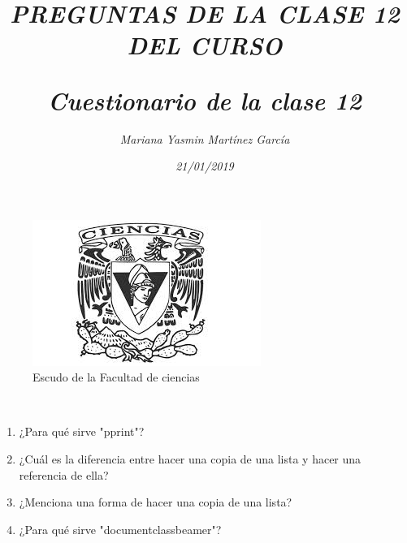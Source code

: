 \documentclass{article}
\title{\Huge\item\color{magenta}\textit{PREGUNTAS DE LA CLASE 12 DEL CURSO}}
\author{\Large\textit{Mariana Yasmin Martínez García}}
\date{\Large\textit{21/01/2019}}
\begin{document}
\begin{figure}[t]
	\centering
	\includegraphics[width=0.7\linewidth]{Imagenes/1}
	\caption{Escudo de la Facultad de ciencias}
	\label{figura:1}
\end{figure}

	\maketitle
		
	\newpage
	
	\title{\huge\color{magenta}\textbf{\textit{Cuestionario de la clase 12}}} \\
	\begin{enumerate}
		 \item{\Large\color{red} ¿Para qué sirve "pprint"?}
		 \item{\Large\color{red} ¿Cuál es la diferencia entre hacer una copia de una lista y hacer una referencia de ella?}
		 \item{\Large\color{red} ¿Menciona una forma de hacer una copia de una lista?}
		 \item{\Large\color{red} ¿Para qué sirve "documentclass{beamer}"?}
	\end{enumerate}
	
\end{document}
